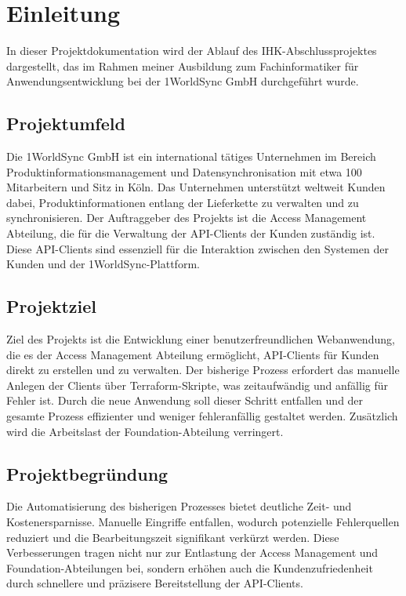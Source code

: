 \section{Einleitung}
\label{sec:Einleitung}
In dieser Projektdokumentation wird der Ablauf des IHK-Abschlussprojektes dargestellt, das im Rahmen meiner Ausbildung zum Fachinformatiker für Anwendungsentwicklung bei der 1WorldSync GmbH durchgeführt wurde.

\subsection{Projektumfeld} 
\label{sec:Projektumfeld}
Die 1WorldSync GmbH ist ein international tätiges Unternehmen im Bereich Produktinformationsmanagement und Datensynchronisation mit etwa 100 Mitarbeitern und Sitz in Köln. Das Unternehmen unterstützt weltweit Kunden dabei, Produktinformationen entlang der Lieferkette zu verwalten und zu synchronisieren. Der Auftraggeber des Projekts ist die Access Management Abteilung, die für die Verwaltung der API-Clients der Kunden zuständig ist. Diese API-Clients sind essenziell für die Interaktion zwischen den Systemen der Kunden und der 1WorldSync-Plattform.


\subsection{Projektziel} 
\label{sec:Projektziel}
Ziel des Projekts ist die Entwicklung einer benutzerfreundlichen Webanwendung, die es der Access Management Abteilung ermöglicht, API-Clients für Kunden direkt zu erstellen und zu verwalten. Der bisherige Prozess erfordert das manuelle Anlegen der Clients über Terraform-Skripte, was zeitaufwändig und anfällig für Fehler ist. Durch die neue Anwendung soll dieser Schritt entfallen und der gesamte Prozess effizienter und weniger fehleranfällig gestaltet werden. Zusätzlich wird die Arbeitslast der Foundation-Abteilung verringert.


\subsection{Projektbegründung} 
\label{sec:Projektbegruendung}

Die Automatisierung des bisherigen Prozesses bietet deutliche Zeit- und Kostenersparnisse. Manuelle Eingriffe entfallen, wodurch potenzielle Fehlerquellen reduziert und die Bearbeitungszeit signifikant verkürzt werden. Diese Verbesserungen tragen nicht nur zur Entlastung der Access Management und Foundation-Abteilungen bei, sondern erhöhen auch die Kundenzufriedenheit durch schnellere und präzisere Bereitstellung der API-Clients.




